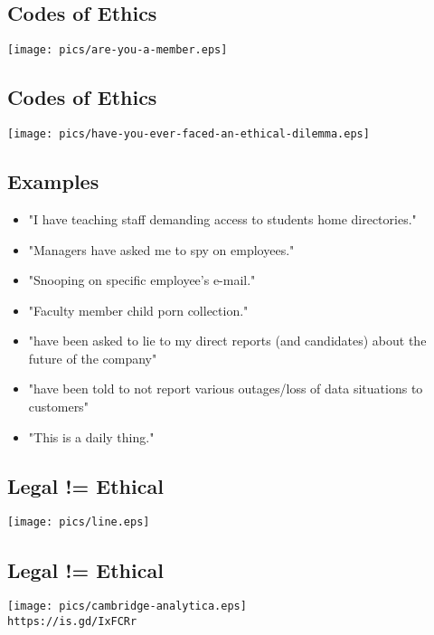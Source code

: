 \documentclass[xga]{xdvislides}
\begin{document}
\subsection{Codes of Ethics}
\vspace*{\fill}
\begin{center}
	\texttt{[image: pics/are-you-a-member.eps]}
\end{center}
\vspace*{\fill}

\subsection{Codes of Ethics}
\vspace*{\fill}
\begin{center}
	\texttt{[image: pics/have-you-ever-faced-an-ethical-dilemma.eps]}
\end{center}
\vspace*{\fill}

\subsection{Examples}
\begin{itemize}
	\item "I have teaching staff demanding access to students home directories."
	\item "Managers have asked me to spy on employees."
	\item "Snooping on specific employee's e-mail."
	\item "Faculty member child porn collection."
	\item "have been asked to lie to my direct reports (and candidates) about the future of the company"
	\item "have been told to not report various outages/loss of data situations to customers"
	\item "This is a daily thing."
\end{itemize}

\subsection{Legal != Ethical}
\vspace*{\fill}
\begin{center}
	\texttt{[image: pics/line.eps]}
\end{center}
\vspace*{\fill}

\subsection{Legal != Ethical}
\vspace*{\fill}
\begin{center}
	\texttt{[image: pics/cambridge-analytica.eps]} \\

	\small
	{\tt https://is.gd/IxFCRr}
	\Normalsize
\end{center}
\vspace*{\fill}
\end{document}
